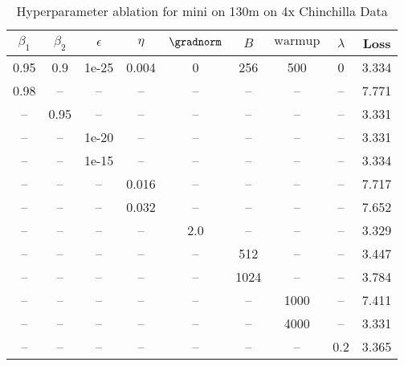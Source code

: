 \begin{table}[h!]
\centering
\caption{Hyperparameter ablation for mini on 130m on 4x Chinchilla Data}
\label{tab:ablation_mini_130m_on_4x_chinchilla_data}
\begin{tabular}{ccccccccc}
\toprule
$\beta_1$ & $\beta_2$ & $\epsilon$ & $\eta$ & $\gradnorm$ & $B$ & $\mathrm{warmup}$ & $\lambda$ & Loss \\
\midrule
0.95 & 0.9 & 1e-25 & 0.004 & 0 & 256 & 500 & 0 & 3.334 \\
\midrule
0.98 & -- & -- & -- & -- & -- & -- & -- & 7.771 \\
-- & 0.95 & -- & -- & -- & -- & -- & -- & 3.331 \\
-- & -- & 1e-20 & -- & -- & -- & -- & -- & 3.331 \\
-- & -- & 1e-15 & -- & -- & -- & -- & -- & 3.334 \\
-- & -- & -- & 0.016 & -- & -- & -- & -- & 7.717 \\
-- & -- & -- & 0.032 & -- & -- & -- & -- & 7.652 \\
-- & -- & -- & -- & 2.0 & -- & -- & -- & 3.329 \\
-- & -- & -- & -- & -- & 512 & -- & -- & 3.447 \\
-- & -- & -- & -- & -- & 1024 & -- & -- & 3.784 \\
-- & -- & -- & -- & -- & -- & 1000 & -- & 7.411 \\
-- & -- & -- & -- & -- & -- & 4000 & -- & 3.331 \\
-- & -- & -- & -- & -- & -- & -- & 0.2 & 3.365 \\
\bottomrule
\end{tabular}
\end{table}

